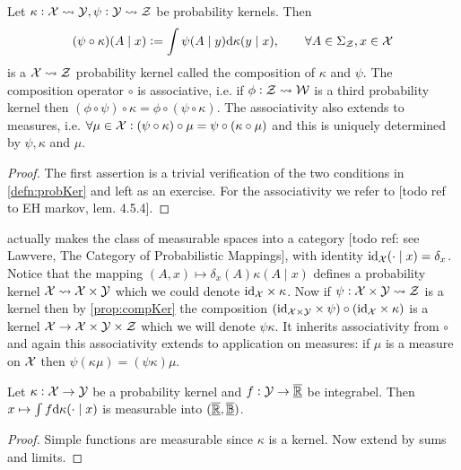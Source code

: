 \begin{prop}
  Let $\kappa : \mathcal{X} \leadsto \mathcal{Y}, \psi : \mathcal{Y} \leadsto \mathcal{Z}$
  be probability kernels. Then
  \[ (\psi \circ \kappa)(A \mid x) \vcentcolon=
    \int \psi(A \mid y) \mathrm{d} \kappa(y \mid x)
  ,\qquad \forall A \in \Sigma_{\mathcal{Z}}, x \in \mathcal{X} \]
  is a $\mathcal{X} \leadsto \mathcal{Z}$ probability kernel called the
  composition of $\kappa$ and $\psi$. The composition operator
  $\circ$ is associative, i.e. if $\phi : \mathcal{Z} \leadsto \mathcal{W}$ is
  a third probability kernel then $(\phi \circ \psi) \circ \kappa = 
  \phi \circ (\psi \circ \kappa)$.
  The associativity also extends to measures, i.e.
  $\forall \mu \in \mathcal{X}
  : (\psi \circ \kappa) \circ \mu = \psi \circ (\kappa \circ \mu) $
  and this is uniquely determined by $\psi, \kappa$ and $\mu$.
  \label{prop:compKer}
\end{prop}
\begin{proof}
  The first assertion is a trivial verification of the two conditions
  in \cref{defn:probKer} and left as an exercise.
  For the associativity we refer to [todo ref to EH markov, lem. 4.5.4].
\end{proof}

 actually makes the class of measurable spaces
into a category [todo ref: see Lawvere, The Category of Probabilistic
Mappings], with identity $\text{id}_{\mathcal{X}}(\cdot \mid x) = \delta_x$.
Notice that the mapping $(A, x) \mapsto \delta_x(A) \kappa(A \mid x)$
defines a probability kernel $\mathcal{X} \leadsto \mathcal{X} \times \mathcal{Y}$
which we could denote $\text{id}_{\mathcal{X}} \times \kappa$.
Now if $\psi : \mathcal{X} \times \mathcal{Y} \leadsto \mathcal{Z}$ is a kernel
then by \cref{prop:compKer} the composition
$(\text{id}_{\mathcal{X} \times \mathcal{Y}} \times \psi)
\circ (\text{id}_{\mathcal{X}} \times \kappa)$
is a kernel $\mathcal{X} \to \mathcal{X} \times \mathcal{Y} \times \mathcal{Z}$
which we will denote $\psi \kappa$.
It inherits associativity from $\circ$ and again this associativity
extends to application on measures: if $\mu$ is a measure on $\mathcal{X}$
then $\psi (\kappa \mu) = (\psi \kappa) \mu$.

\begin{prop}
  Let $\kappa : \mathcal{X} \to \mathcal{Y}$ be a probability kernel
  and $f : \mathcal{Y} \to \overline{\underline{\mathbb{R}}}$ be integrabel.
  Then $x \mapsto \int f \mathrm{d} \kappa(\cdot \mid x)$ is measurable
  into $(\overline{\underline{\mathbb{R}}}, \overline{\underline{\mathbb{B}}})$.
  \label{prop:intKerMeas}
\end{prop}
\begin{proof}
  Simple functions are measurable since $\kappa$ is a kernel.
  Now extend by sums and limits.
\end{proof}


